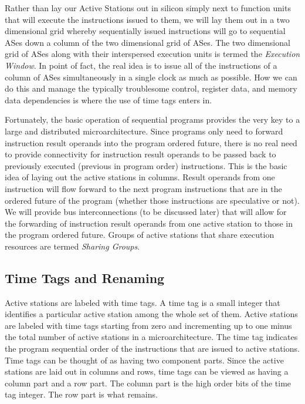 \documentclass[10pt,dvips]{article}
\begin{document}
Rather than lay our Active Stations out in silicon simply next to
function units that will execute the instructions issued to them,
we will lay them out in a two dimensional grid whereby sequentially
issued instructions will go to sequential ASes down a column of
the two dimensional grid of ASes.  The two dimensional
grid of ASes along with their interspersed execution units
is termed the \textit{Execution Window}.
In point of fact, the real
idea is to issue all of the instructions of a column of ASes simultaneously
in a single clock as much as possible.  How we can do this and
manage the typically troublesome control, register data, and memory
data dependencies is where the use of time tags enters in.

Fortunately, the basic operation of sequential programs provides
the very key to a large and distributed microarchitecture.
Since programs only need to forward instruction result operands into the
program ordered future, there is no real need to provide connectivity
for instruction result operands to be passed back to previously
executed (previous in program order) instructions.  This is the basic
idea of laying out the active stations in columns.  Result operands
from one instruction will flow forward to the next program instructions
that are in the ordered future of the program (whether those
instructions are speculative or not).  We will provide bus
interconnections (to be discussed later) that will allow for the
forwarding of instruction result operands from one active station to
those in the program ordered future.  Groups of active stations
that share execution resources are termed \textit{Sharing Groups}.

\subsection{Time Tags and Renaming}
Active stations are labeled with time tags.  A time tag is a small
integer that identifies a particular active station among the whole
set of them.  Active stations are labeled with time tags starting
from zero and incrementing up to one minus the total number of
active stations in a microarchitecture.  The time tag indicates
the program sequential order of the instructions that are issued
to active stations.  Time tags can be thought of as having two
component parts.  Since the active stations are laid out
in columns and rows, time tags can be viewed as having a column
part and a row part.  The column part is the high order bits of
the time tag integer.  The row part is what remains.
\end{document}
